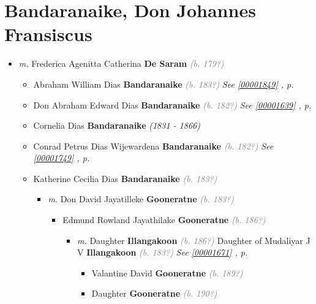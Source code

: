\documentclass[10pt, openany]{book}
\begin{document}
\chapter{Bandaranaike, Don Johannes Fransiscus}
\label{00001637}
\textcolor{slmaroon}{\textit{}}
\begin{itemize}
\item{\textit{m.} Frederica Agenitta Catherina \textbf{De Saram} \textcolor{gray}{\textit{(b. 179?)}}   \label{couple:00001637:00001638} \begin{itemize}
\item{Abraham William Dias \textbf{Bandaranaike} \textcolor{gray}{\textit{(b. 183?)}} \textcolor{slteal}{\textit{See  \autoref{00001849} \textit{, p. \pageref{00001849} }}}}
\item{Don Abraham Edward Dias \textbf{Bandaranaike} \textcolor{gray}{\textit{(b. 182?)}} \textcolor{slteal}{\textit{See  \autoref{00001639} \textit{, p. \pageref{00001639} }}}}
\item{Cornelia Dias \textbf{Bandaranaike} \textcolor{slorange}{\textit{(1831 - 1866)}}
  }
\item{Conrad Petrus  Dias Wijewardena \textbf{Bandaranaike} \textcolor{gray}{\textit{(b. 182?)}} \textcolor{slteal}{\textit{See  \autoref{00001749} \textit{, p. \pageref{00001749} }}}}
\item{Katherine Cecilia Dias \textbf{Bandaranaike} \textcolor{gray}{\textit{(b. 183?)}}
\begin{itemize}
\item{\textit{m.} Don David Jayatilleke \textbf{Gooneratne} \textcolor{gray}{\textit{(b. 183?)}}   \label{couple:00001668:00001669} \begin{itemize}
\item{Edmund Rowland Jayathilake \textbf{Gooneratne} \textcolor{gray}{\textit{(b. 186?)}}
\begin{itemize}
\item{\textit{m.} Daughter \textbf{Illangakoon} \textcolor{gray}{\textit{(b. 186?)}} Daughter of  Mudaliyar J V \textbf{Illangakoon} \textcolor{gray}{\textit{(b. 183?)}} \textcolor{slteal}{\textit{See  \autoref{00001671} \textit{, p. \pageref{00001671} }}}   \label{couple:00001670:00001672} \begin{itemize}
\item{Valantine David \textbf{Gooneratne} \textcolor{gray}{\textit{(b. 189?)}}
  }
\item{Daughter \textbf{Gooneratne} \textcolor{gray}{\textit{(b. 190?)}}
}
\end{itemize}}
\end{itemize}}
\end{itemize}}
\end{itemize}}
\end{itemize}}
\end{itemize}
\end{document}
